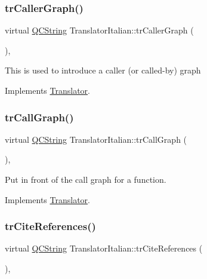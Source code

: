\subsubsection{\texorpdfstring{trCallerGraph()}{trCallerGraph()}}
{\footnotesize\ttfamily virtual \mbox{\hyperlink{class_q_c_string}{Q\+C\+String}} Translator\+Italian\+::tr\+Caller\+Graph (\begin{DoxyParamCaption}{ }\end{DoxyParamCaption})\hspace{0.3cm}{\ttfamily [inline]}, {\ttfamily [virtual]}}

This is used to introduce a caller (or called-\/by) graph 

Implements \mbox{\hyperlink{class_translator}{Translator}}.

\mbox{\label{class_translator_italian_a20cf1b2dc9f92f8d66149ce672b277d6}} 
\subsubsection{\texorpdfstring{trCallGraph()}{trCallGraph()}}
{\footnotesize\ttfamily virtual \mbox{\hyperlink{class_q_c_string}{Q\+C\+String}} Translator\+Italian\+::tr\+Call\+Graph (\begin{DoxyParamCaption}{ }\end{DoxyParamCaption})\hspace{0.3cm}{\ttfamily [inline]}, {\ttfamily [virtual]}}

Put in front of the call graph for a function. 

Implements \mbox{\hyperlink{class_translator}{Translator}}.

\mbox{\label{class_translator_italian_a85919834b6b72e9dd99543dd396172dd}} 
\subsubsection{\texorpdfstring{trCiteReferences()}{trCiteReferences()}}
{\footnotesize\ttfamily virtual \mbox{\hyperlink{class_q_c_string}{Q\+C\+String}} Translator\+Italian\+::tr\+Cite\+References (\begin{DoxyParamCaption}{ }\end{DoxyParamCaption})\hspace{0.3cm}{\ttfamily [inline]}, {\ttfamily [virtual]}}

